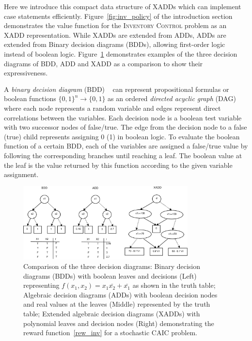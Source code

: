 \documentclass[twoside,11pt]{article}
\newcommand{\InventoryControl}{\textsc{Inventory Control }}
\begin{document}
Here we introduce this compact data structure of XADDs which can implement case statements efficiently. Figure~\ref{fig:inv_policy} of the introduction section demonstrates the value function for the \InventoryControl problem as an XADD representation. While XADDs are extended from ADDs, ADDs are extended from Binary decision diagrams (BDDs), allowing first-order logic instead of boolean logic. Figure~\ref{fig:bdd_add_xadd} demonstrates examples of the three decision diagrams of BDD, ADD and XADD as a comparison to show their expressiveness.   

A \emph{binary decision diagram} (BDD) ~\cite{bryant} can represent propositional formulas or boolean functions $\lbrace 0,1\rbrace^n \rightarrow \lbrace 0,1\rbrace$ as an ordered \emph{directed acyclic graph} (DAG) where each node represents a random variable and edges represent direct correlations between the variables. Each decision node is a boolean test variable with two successor nodes of false/true. The edge from the decision node to a false (true) child represents assigning  0 (1) in boolean logic. To evaluate the boolean function of a certain BDD, each of the variables are assigned a false/true value by following the corresponding branches until reaching a leaf. The boolean value at the leaf is the value returned by this function according to the given variable assignment. 
\vspace{10mm}
\begin{figure}[t!]
\centering
\vspace{-3mm}
\includegraphics[width=0.8\textwidth]{Figures1/diagrams/bdd_add_xadd.pdf}
\vspace{-2mm}

\caption{\footnotesize Comparison of the three decision diagrams: Binary decision diagrams (BDDs) with boolean leaves and decisions (Left) representing $f(x_1,x_2) = x_1\bar{x_2}+\bar{x_1}$ as shown in the truth table; Algebraic decision diagrams (ADDs) with  boolean decision nodes and real values at the leaves (Middle) represented by the truth table; Extended algebraic decision diagrams (XADDs) with polynomial leaves and decision nodes (Right) demonstrating the reward function~\ref{rew_inv} for a stochastic CAIC problem.}
\label{fig:bdd_add_xadd}
\vspace{-6mm}
\end{figure}
\vspace{-6mm}
\end{document}
